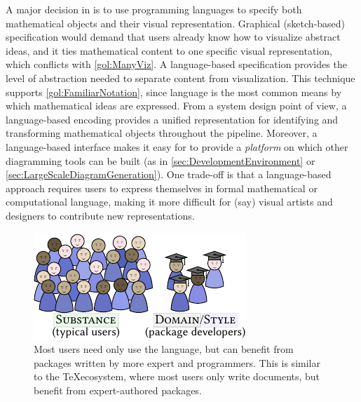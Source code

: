 A major decision in \Penrose{} is to use programming languages to specify both mathematical objects and their visual representation.  Graphical (\eg sketch-based) specification would demand that users already know how to visualize abstract ideas, and it ties mathematical content to one specific visual representation, which conflicts with \ref{gol:ManyViz}.  A language-based specification provides the level of abstraction needed to separate content from visualization. This technique supports \ref{gol:FamiliarNotation}, since language is the most common means by which mathematical ideas are expressed.  From a system design point of view, a language-based encoding provides a unified representation for identifying and transforming mathematical objects throughout the pipeline.  Moreover, a language-based interface makes it easy for \Penrose{} to provide a \emph{platform} on which other diagramming tools can be built (as in \cref{sec:DevelopmentEnvironment} or \cref{sec:LargeScaleDiagramGeneration}).  One trade-off is that a language-based approach requires users to express themselves in formal mathematical or computational language, making it more difficult for (say) visual artists and designers to contribute new representations.

\begin{figure}[b]
  \begin{minipage}[c]{.35\linewidth}
    \caption{Most \Penrose{} users need only use the \Substance{} language, but can benefit from packages written by more expert \Domain{} and \Style{} programmers. This is similar to the \TeX ecosystem, where most users only write documents, but benefit from expert-authored packages.\label{fig:NoviceExpertUsers}}
  \end{minipage}\hfill
  \begin{minipage}[c]{.55\linewidth}
     \includegraphics[scale=1.5]{assets/penrose/NoviceExpertUsers.pdf}
  \end{minipage}\hfill
\end{figure}

